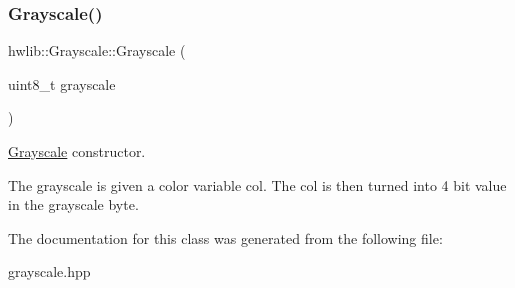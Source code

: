 \subsubsection{\texorpdfstring{Grayscale()}{Grayscale()}}
{\footnotesize\ttfamily hwlib\+::\+Grayscale\+::\+Grayscale (\begin{DoxyParamCaption}\item[{uint8\+\_\+t}]{grayscale }\end{DoxyParamCaption})\hspace{0.3cm}{\ttfamily [inline]}}



\hyperlink{classhwlib_1_1Grayscale}{Grayscale} constructor. 

The grayscale is given a color variable col. The col is then turned into 4 bit value in the grayscale byte. 

The documentation for this class was generated from the following file\+:\begin{DoxyCompactItemize}
\item 
grayscale.\+hpp\end{DoxyCompactItemize}
